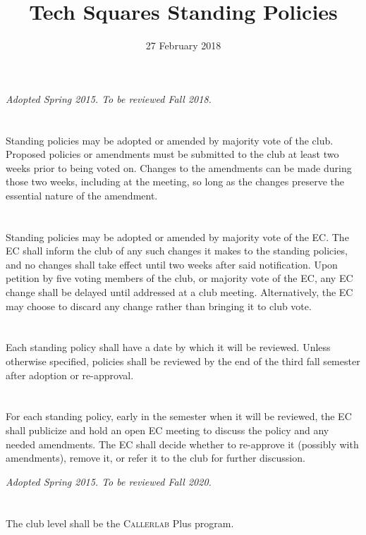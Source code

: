 \documentclass{bylaws}
\title{Tech Squares Standing Policies}
\date{27 February 2018}
\newcommand{\sptimes}[2]{\emph{Adopted #1. To be reviewed #2.}}
\begin{document}
\maketitle

\label{pol:adopt}
\sptimes{Spring 2015}{Fall 2018}
\section{}Standing policies may be adopted or amended by majority vote of the club. Proposed policies or amendments must be submitted to the club at least two weeks prior to being voted on. Changes to the amendments can be made during those two weeks, including at the meeting, so long as the changes preserve the essential nature of the amendment.
\section{}Standing policies may be adopted or amended by majority vote of the EC. The EC shall inform the club of any such changes it makes to the standing policies, and no changes shall take effect until two weeks after said notification. Upon petition by five voting members of the club, or majority vote of the EC, any EC change shall be delayed until addressed at a club meeting. Alternatively, the EC may choose to discard any change rather than bringing it to club vote.
\section{}Each standing policy shall have a date by which it will be reviewed. Unless otherwise specified, policies shall be reviewed by the end of the third fall semester after adoption or re-approval.
\section{}For each standing policy, early in the semester when it will be reviewed, the EC shall publicize and hold an open EC meeting to discuss the policy and any needed amendments. The EC shall decide whether to re-approve it (possibly with amendments), remove it, or refer it to the club for further discussion.


\sptimes{Spring 2015}{Fall 2020}
\section{}The club level shall be the \textsc{Callerlab} Plus program.
\end{document}
